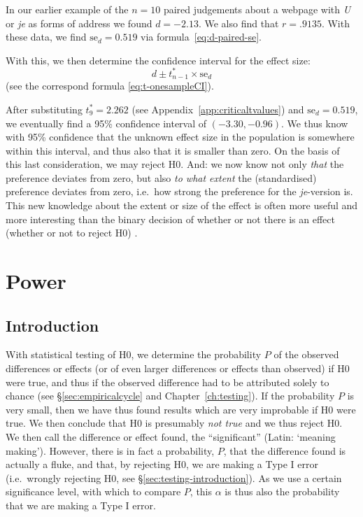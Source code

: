 \documentclass[
]{book}
\begin{document}
In
our earlier example of the \(n=10\) paired judgements about a webpage
with \emph{U} or \emph{je} as forms of address we found \(d=-2.13\). We also find
that \(r=.9135\). With these data, we find \(\textrm{se}_d = 0.519\) via
formula~\eqref{eq:d-paired-se}.

With this, we then determine the confidence interval for the
effect size:
\begin{equation}
   \label{eq:d-paired-CI}
    d \pm t^*_{n-1} \times \textrm{se}_d 
\end{equation}
(see the correspond
formula \eqref{eq:t-onesampleCI}).

After substituting \(t^*_9=2.262\) (see Appendix~\ref{app:criticaltvalues}) and
\(\textrm{se}_d = 0.519\), we eventually find a 95\% confidence interval of \((-3.30,-0.96)\).
We thus
know with 95\% confidence that the unknown effect size in the population
is somewhere within this interval, and thus also that it is smaller than
zero. On the basis of this last consideration, we may reject H0.
And: we now know not only \emph{that} the preference deviates from zero, but
also \emph{to what extent} the (standardised) preference deviates from zero,
i.e.~how strong the preference for the \emph{je}-version is. This new knowledge
about the extent or size of the effect is often more useful and more interesting
than the binary decision of whether or not there is an effect (whether or not
to reject H0) \citep{Cumm12}.

\hypertarget{ch:power}{%
\chapter{Power}\label{ch:power}}

\hypertarget{sec:power-introduction}{%
\section{Introduction}\label{sec:power-introduction}}

With statistical testing of H0, we determine the probability \(P\) of the
observed differences or effects (or of even larger differences or effects
than observed) if H0 were true, and thus if
the observed difference had to be attributed solely to chance
(see §\ref{sec:empiricalcycle} and
Chapter~\ref{ch:testing}). If the probability \(P\) is very small, then
we have thus found results which are very improbable if H0 were true.
We then conclude that H0 is presumably \emph{not true} and we thus reject
H0. We then call the difference or effect found, the ``significant''
(Latin: `meaning making'). However, there is in fact a probability,
\(P\), that the difference found is actually a fluke, and that, by rejecting
H0, we are making a Type I error (i.e.~wrongly rejecting H0,
see
§\ref{sec:testing-introduction}). As we use a certain
significance level, with which to compare \(P\), this \(\alpha\)
is thus also the probability that we are making a Type I error.
\end{document}
